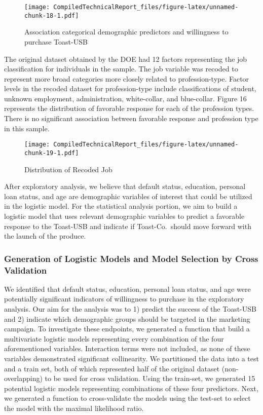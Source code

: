 \documentclass[]{article}
\begin{document}
\begin{figure}
\centering
\texttt{[image: CompiledTechnicalReport\_files/figure-latex/unnamed-chunk-18-1.pdf]}
\caption{Association categorical demographic predictors and willingness
to purchase Toast-USB}
\end{figure}

The original dataset obtained by the DOE had 12 factors representing the
job classification for individuals in the sample. The job variable was
recoded to represent more broad categories more closely related to
profession-type. Factor levels in the recoded dataset for
profession-type include classifications of student, unknown employment,
administration, white-collar, and blue-collar. Figure 16 represents the
distribution of favorable response for each of the profession types.
There is no significant association between favorable response and
profession type in this sample.

\begin{figure}
\centering
\texttt{[image: CompiledTechnicalReport\_files/figure-latex/unnamed-chunk-19-1.pdf]}
\caption{Distribution of Recoded Job}
\end{figure}

After exploratory analysis, we believe that default status, education,
personal loan status, and age are demographic variables of interest that
could be utilized in the logistic model. For the statistical analysis
portion, we aim to build a logistic model that uses relevant demographic
variables to predict a favorable response to the Toast-USB and indicate
if Toast-Co.~should move forward with the launch of the produce.

\hypertarget{generation-of-logistic-models-and-model-selection-by-cross-validation}{%
\subsubsection{Generation of Logistic Models and Model Selection by
Cross
Validation}\label{generation-of-logistic-models-and-model-selection-by-cross-validation}}

We identified that default status, education, personal loan status, and
age were potentially significant indicators of willingness to purchase
in the exploratory analysis. Our aim for the analysis was to 1) predict
the success of the Toast-USB and 2) indicate which demographic groups
should be targeted in the marketing campaign. To investigate these
endpoints, we generated a function that build a multivariate logistic
models representing every combination of the four aforementioned
variables. Interaction terms were not included, as none of these
variables demonstrated significant collinearity. We partitioned the data
into a test and a train set, both of which represented half of the
original dataset (non-overlapping) to be used for cross validation.
Using the train-set, we generated 15 potential logistic models
representing combinations of these four predictors. Next, we generated a
function to cross-validate the models using the test-set to select the
model with the maximal likelihood ratio.
\end{document}

